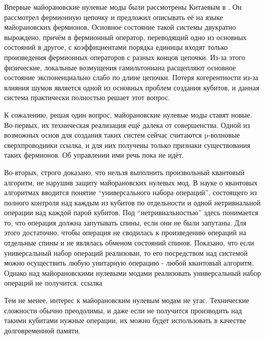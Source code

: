 \documentclass[a4paper,12pt]{article}
\theoremstyle{plain} %
\theoremstyle{definition} %
\theoremstyle{remark} %
\begin{document}
Впервые майорановские нулевые моды были рассмотрены Китаевым в \cite{kitaev}. Он рассмотрел фермионную цепочку и предложил описывать её на языке майорановских фермионов. Основное состояние такой системы двукратно вырождено, причём в фермионный оператор, переводящий одно из основных состояний в другое, с коэффициентами порядка единицы входят только произведения фермионных операторов с разных концов цепочки. Из-за этого физические, локальные возмущения гамильтониана расщепляют основное состояние экспоненциально слабо по длине цепочки. Потеря когерентности из-за влияния шумов является одной из основных проблем создания кубитов, и данная система практически полностью решает этот вопрос.

К сожалению, решая один вопрос, майорановские нулевые моды ставят новые. Во-первых, их техническая реализация ещё далека от совершенства. Одной из возможных основ для создания таких систем сейчас считаются p-волновые сверхпроводники {\color{red}ссылка}, и для них получены только признаки существования таких фермионов. Об управлении ими речь пока не идёт.

Во-вторых, строго доказано, что нельзя выполнить произвольный квантовый алгоритм, не нарушив защиту майорановских нулевых мод. В науке о квантовых алгоритмах вводится понятие ``универсального набора операций'', состоящего из полного контроля над каждым из кубитов по отдельности и одной нетривиальной операции над каждой парой кубитов. Под ``нетривиальностью'' здесь понимается то, что операция должна запутывать спины, если они не были запутаны. Для этого достаточно, чтобы операция не сводилась к произведению операций на отдельные спины и не являлась обменом состояний спинов. Показано, что если универсальный набор операций реализован, то его посредством над системой можно осуществить любую унитарную операцию - любой квантовый алгоритм. Однако над майорановскими нулевыми модами реализовать универсальный набор операций не получится. {\color{red}ссылка}

Тем не менее, интерес к майорановским нулевым модам не угас. Технические сложности обычно преодолимы, и даже если не получится производить над такими кубитами нужные операции, их можно будет использовать в качестве долговременной памяти. 
\end{document}
